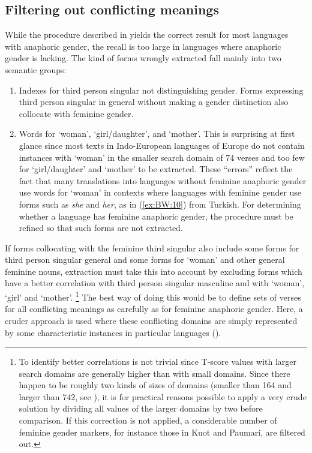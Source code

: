 \documentclass[output=collectionpaper]{langsci/langscibook}
\begin{document}
\subsection{Filtering out conflicting meanings}
\label{sec:BW:3.3}

While the procedure described in  yields the correct result for most languages with anaphoric gender, the recall is too large in languages where anaphoric gender is lacking. The kind of forms wrongly extracted fall mainly into two semantic groups:

\begin{enumerate}[label=(\roman*)]
\item Indexes for third person singular not distinguishing gender. Forms expressing third person singular in general without making a gender distinction also collocate with feminine gender.
\item Words for ‘woman’, ‘girl/daughter’, and ‘mother’. This is surprising at first glance since most texts in Indo-European languages of Europe do not contain instances with ‘woman’ in the smaller search domain of 74 verses and too few for ‘girl/daughter’ and ‘mother’ to be extracted. These “errors” reflect the fact that many translations into languages without feminine anaphoric gender use words for ‘woman’ in contexts where languages with feminine gender use forms such as \textit{she} and \textit{her}, as in (\ref{ex:BW:10}) from Turkish. For determining whether a language has feminine anaphoric gender, the procedure must be refined so that such forms are not extracted.
\end{enumerate}

If forms collocating with the feminine third singular also include some forms for third person singular general and some forms for ‘woman’ and other general feminine nouns, extraction must take this into account by excluding forms which have a better correlation with third person singular masculine and with ‘woman’, ‘girl’ and ‘mother’.%
\footnote{%
To identify better correlations is not trivial since T-score values with larger search domains are generally higher than with small domains. Since there happen to be roughly two kinds of sizes of domains (smaller than 164 and larger than 742, see ), it is for practical reasons possible to apply a very crude solution by dividing all values of the larger domains by two before comparison. If this correction is not applied, a considerable number of feminine gender markers, for instance those in Kuot and Paumarí, are filtered out.
} %
The best way of doing this would be to define sets of verses for all conflicting meanings as carefully as for feminine anaphoric gender. Here, a cruder approach is used where these conflicting domains are simply represented by some characteristic instances in particular languages ().
\end{document}
